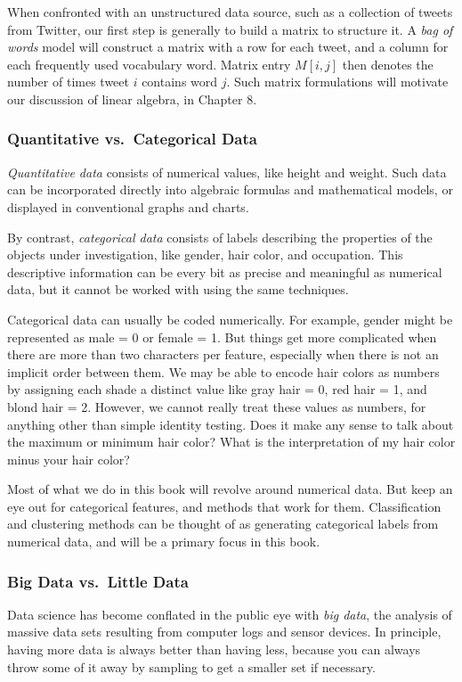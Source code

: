\documentclass[10pt]{article}
\begin{document}
When confronted with an unstructured data source, such as a collection of tweets from Twitter, our first step is generally to build a matrix to structure it. A \emph{bag of words} model will construct a matrix with a row for each tweet, and a column for each frequently used vocabulary word. Matrix entry $M[i, j]$ then denotes the number of times tweet $i$ contains word $j$. Such matrix formulations will motivate our discussion of linear algebra, in Chapter 8.

\subsubsection{Quantitative vs.\ Categorical Data}
\emph{Quantitative data} consists of numerical values, like height and weight. Such data can be incorporated directly into algebraic formulas and mathematical models, or displayed in conventional graphs and charts.

By contrast, \emph{categorical data} consists of labels describing the properties of the objects under investigation, like gender, hair color, and occupation. This descriptive information can be every bit as precise and meaningful as numerical data, but it cannot be worked with using the same techniques.

Categorical data can usually be coded numerically. For example, gender might be represented as male = 0 or female = 1. But things get more complicated when there are more than two characters per feature, especially when there is not an implicit order between them. We may be able to encode hair colors as numbers by assigning each shade a distinct value like gray hair = 0, red hair = 1, and blond hair = 2. However, we cannot really treat these values as numbers, for anything other than simple identity testing. Does it make any sense to talk about the maximum or minimum hair color? What is the interpretation of my hair color minus your hair color?

Most of what we do in this book will revolve around numerical data. But keep an eye out for categorical features, and methods that work for them. Classification and clustering methods can be thought of as generating categorical labels from numerical data, and will be a primary focus in this book.

\subsubsection{Big Data vs.\ Little Data}
Data science has become conflated in the public eye with \emph{big data}, the analysis of massive data sets resulting from computer logs and sensor devices. In principle, having more data is always better than having less, because you can always throw some of it away by sampling to get a smaller set if necessary.
\end{document}
